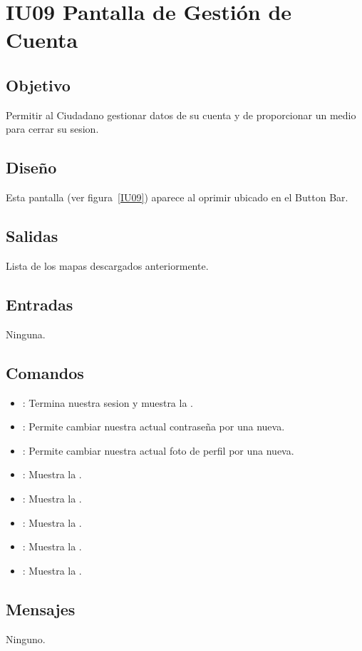 \section{IU09 Pantalla de Gestión de Cuenta}

\subsection{Objetivo}
	Permitir al Ciudadano gestionar datos de su cuenta y de proporcionar un medio para cerrar su sesion.

\subsection{Diseño}
	Esta pantalla  (ver figura~\ref{IU09}) aparece al oprimir  ubicado en el Button Bar.
	

\subsection{Salidas}

	Lista de los mapas descargados anteriormente.

\subsection{Entradas}
	Ninguna.

\subsection{Comandos}
\begin{itemize}
	\item {}: Termina nuestra sesion y muestra la .
	\item {}: Permite cambiar nuestra actual contraseña por una nueva.
	\item {}: Permite cambiar nuestra actual foto de perfil por una nueva.
	\item {}: Muestra la .
	\item {}: Muestra la .
	\item {}: Muestra la .
	\item {}: Muestra la .
	\item {}: Muestra la .
\end{itemize}

\subsection{Mensajes}

	Ninguno.

\clearpage